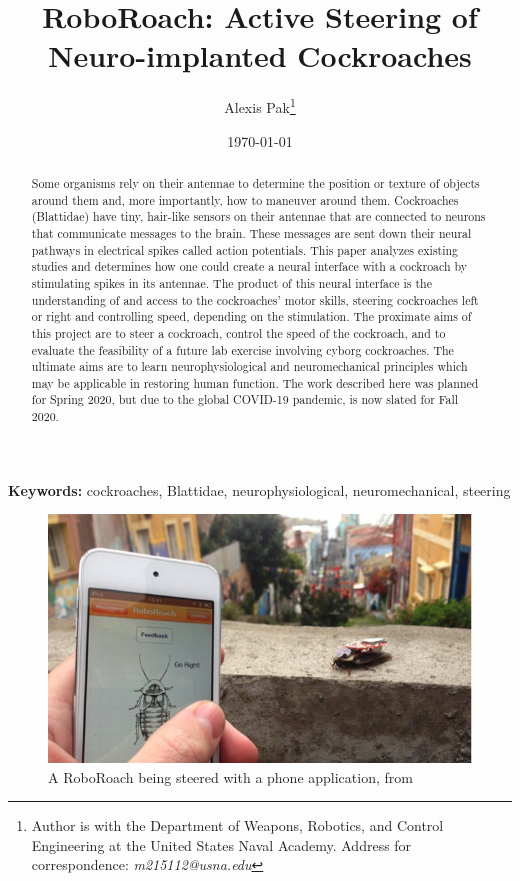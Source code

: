\documentclass[10pt]{article}
\title{RoboRoach: Active Steering of Neuro-implanted Cockroaches}
\author{Alexis Pak\thanks{Author is with the Department of Weapons, Robotics, and Control Engineering at the United States Naval Academy. Address for correspondence: \emph{m215112@usna.edu}}}
\date{\today}
\begin{document}
\maketitle
\begin{abstract}
Some organisms rely on their antennae to determine the position or texture of objects around them and, more importantly, how to maneuver around them. Cockroaches (Blattidae) have tiny, hair-like sensors on their antennae that are connected to neurons that communicate messages to the brain. These messages are sent down their neural pathways in electrical spikes called action potentials. This paper analyzes existing studies and determines how one could create a neural interface with a cockroach by stimulating spikes in its antennae. The product of this neural interface is the understanding of and access to the cockroaches' motor skills, steering cockroaches left or right and controlling speed, depending on the stimulation. The proximate aims of this project are to steer a cockroach, control the speed of the cockroach, and to evaluate the feasibility of a future lab exercise involving cyborg cockroaches. The ultimate aims are to learn neurophysiological and neuromechanical principles which may be applicable in restoring human function. The work described here was planned for Spring 2020, but due to the global COVID-19 pandemic, is now slated for Fall 2020. 
\end{abstract}
{\scriptsize\textbf{Keywords:} cockroaches, Blattidae, neurophysiological, neuromechanical, steering}


\begin{figure}[ht!]
\centering
\includegraphics[scale=0.5]{Figures/hollywood.JPG}
\caption{A RoboRoach being steered with a phone application, from \citep{backyardbrains2020roboroach}}
\label{fig:hollywood}
\end{figure}
\end{document}
